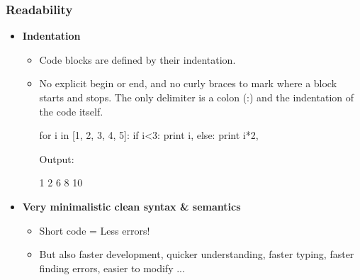 \documentclass[handout]{beamer}
\begin{document}
\begin{frame}
    \frametitle{Readability}
    \begin{itemize}
        \item \textbf{Indentation}
            \begin{itemize}
                \item Code blocks are defined by their indentation.
                \item No explicit begin or end, and no curly braces to mark where a block starts and stops. The only delimiter is a colon (:) and the indentation of the code itself.
                \pause
                \begin{myColorBox}{0.8}{}
\begin{semiverbatim}
for i in [1, 2, 3, 4, 5]:
    if i<3:
        print i,
    else:
        print i*2,
\end{semiverbatim}
                \end{myColorBox}
Output:
                \begin{myColorBox}{0.8}{}
\begin{semiverbatim}
1 2 6 8 10
\end{semiverbatim}
                \end{myColorBox}
        \end{itemize}
        \pause
        \item \textbf{Very minimalistic clean syntax \& semantics}
            \begin{itemize}
                \item Short code = Less errors!
                \item But also faster development, quicker understanding, faster typing, faster finding errors, easier to modify ...
            \end{itemize}
        \end{itemize}
\end{frame}
\end{document}

